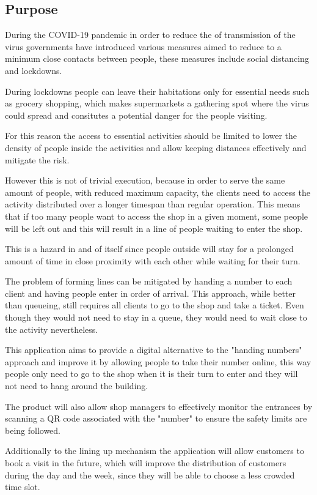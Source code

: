 \subsection{Purpose}

During the COVID-19 pandemic in order to reduce the of transmission of the virus governments have introduced various measures aimed to reduce to a minimum close contacts between people, these measures include social distancing and lockdowns.

During lockdowns people can leave their habitations only for essential needs such as grocery shopping, which makes supermarkets a gathering spot where the virus could spread and consitutes a potential danger for the people visiting.

For this reason the access to essential activities should be limited to lower the density of people inside the activities and allow keeping distances effectively and mitigate the risk.

However this is not of trivial execution, because in order to serve the same amount of people, with reduced maximum capacity, the clients need to access the activity distributed over a longer timespan than regular operation. This means that if too many people want to access the shop in a given moment, some people will be left out and this will result in a line of people waiting to enter the shop.

This is a hazard in and of itself since people outside will stay for a prolonged amount of time in close proximity with each other while waiting for their turn.

The problem of forming lines can be mitigated by handing a number to each client and having people enter in order of arrival. This approach, while better than queueing, still requires all clients to go to the shop and take a ticket. Even though they would not need to stay in a queue, they would need to wait close to the activity nevertheless.

This application aims to provide a digital alternative to the "handing numbers" approach and improve it by allowing people to take their number online, this way people only need to go to the shop when it is their turn to enter and they will not need to hang around the building.

The product will also allow shop managers to effectively monitor the entrances by scanning a QR code associated with the "number" to ensure the safety limits are being followed.

Additionally to the lining up mechanism the application will allow customers to book a visit in the future, which will improve the distribution of customers during the day and the week, since they will be able to choose a less crowded time slot.

